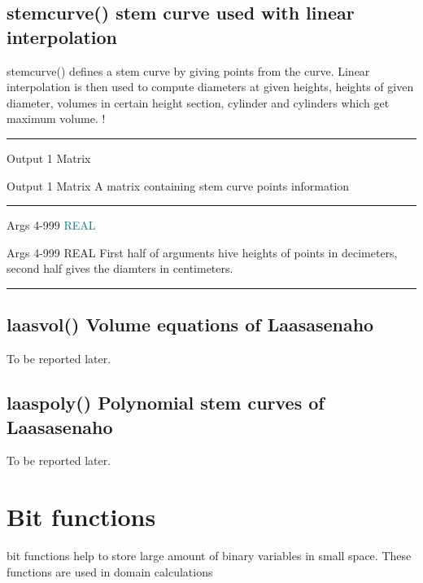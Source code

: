 \subsection{\textcolor{VioletRed}{stemcurve}() stem curve used with linear interpolation} 
\label{stemcurve} 
\textcolor{VioletRed}{stemcurve}() defines a stem curve by giving points from the curve. Linear interpolation 
is then used to compute diameters at given heights, heights of given diameter, 
volumes in certain height section, cylinder and cylinders which get maximum volume. 
	! 
\vspace{0.3cm} 
\hrule 
\vspace{0.3cm} 
\noindent Output \tabto{3cm}  1 \tabto{5cm}  Matrix \tabto{7cm} 
\begin{changemargin}{3cm}{0cm} 
\noindent \noindent Output \tabto{3cm}  1 \tabto{5cm}  Matrix \tabto{7cm} 
A matrix containing stem curve points information 
\end{changemargin} 
\vspace{0.3cm} 
\hrule 
\vspace{0.3cm} 
\noindent Args \tabto{3cm} 4-999 \tabto{5cm}  \textcolor{teal}{REAL} \tabto{7cm} 
\begin{changemargin}{3cm}{0cm} 
\noindent \noindent Args \tabto{3cm} 4-999 \tabto{5cm}  REAL \tabto{7cm} 
First half of arguments hive heights of points in decimeters, second half 
gives the diamters in centimeters. 
 
\end {changemargin} 
\hrule 
\vspace{0.2cm} 
 
\subsection{\textcolor{VioletRed}{laasvol}() Volume equations of Laasasenaho} 
\label{laasvol} 
To be reported later. 
\subsection{\textcolor{VioletRed}{laaspoly}() Polynomial stem curves of Laasasenaho} 
\label{laaspoly} 
To be reported later. 
\section{Bit functions} 
\label{bit} 
bit functions help to store large amount of binary variables in small space. 
These functions are used in domain calculations 
